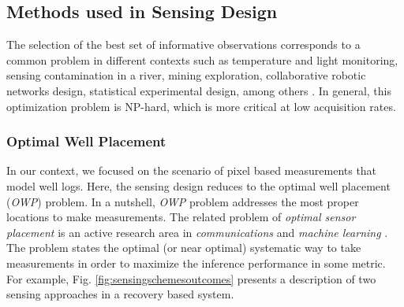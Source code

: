 \subsection{Methods used in Sensing Design}
\label{secSecSenIntro}

The selection of the best set of informative observations corresponds to a common problem in different contexts such as temperature and light monitoring, sensing contamination in a river, mining exploration, collaborative robotic networks design, statistical experimental design, among others \cite{krause06near22,BKWSS06,krause08efficient,guestrin05near}. In general, this optimization problem is NP-hard, which is more critical at low acquisition rates. 


\subsubsection{Optimal Well Placement}


In our context, we focused on the scenario of pixel based measurements that model well logs. Here, the sensing design reduces to the optimal well placement (\emph{OWP}) problem. In a nutshell, \emph{OWP} problem addresses the most proper locations to make measurements. The related problem of \emph{optimal sensor placement} is an active research area in \emph{communications} \cite{krause11robust,krause09simultaneous} and \emph{machine learning} \cite{guestrin05near,krause08near}. The problem states the optimal (or near optimal) systematic way to take measurements in order to maximize the inference performance in some metric. For example, Fig. \ref{fig:sensingschemesoutcomes} presents a description of two sensing approaches in a recovery based system.


